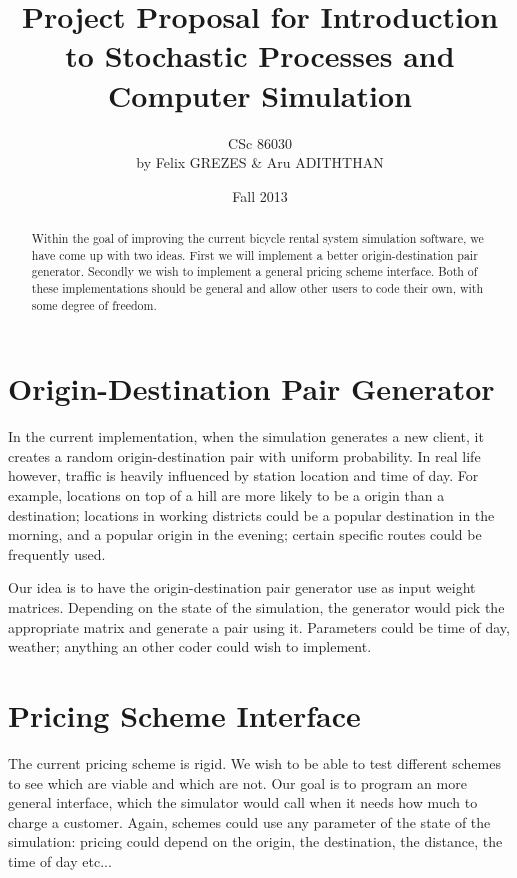 \documentclass[12pt,a4paper,oneside]{article}
\begin{document}
\title{Project Proposal for Introduction to Stochastic Processes and Computer Simulation}
\author{
CSc 86030\\
by Felix GREZES \& Aru ADITHTHAN\\
}
\date{Fall 2013}
\maketitle

\begin{abstract}
\large{
Within the goal of improving the current bicycle rental system simulation software, we have come up with two ideas. First we will implement a better origin-destination pair generator. Secondly we wish to implement a general pricing scheme interface. Both of these implementations should be general and allow other users to code their own, with some degree of freedom.
}
\end{abstract}

\section{Origin-Destination Pair Generator}

\large{
In the current implementation, when the simulation generates a new client, it creates a random origin-destination pair with uniform probability. In real life however, traffic is heavily influenced by station location and time of day. For example, locations on top of a hill are more likely to be a origin than a destination; locations in working districts could be a popular destination in the morning, and a popular origin in the evening; certain specific routes could be frequently used.

Our idea is to have the origin-destination pair generator use as input weight matrices. Depending on the state of the simulation, the generator would pick the appropriate matrix and generate a pair using it. Parameters could be time of day, weather; anything an other coder could wish to implement.
}

\section{Pricing Scheme Interface}

\large{
The current pricing scheme is rigid. We wish to be able to test different schemes to see which are viable and which are not. Our goal is to program an more general interface, which the simulator would call when it needs how much to charge a customer. Again, schemes could use any parameter of the state of the simulation: pricing could depend on the origin, the destination, the distance, the time of day etc...
}
\end{document}

